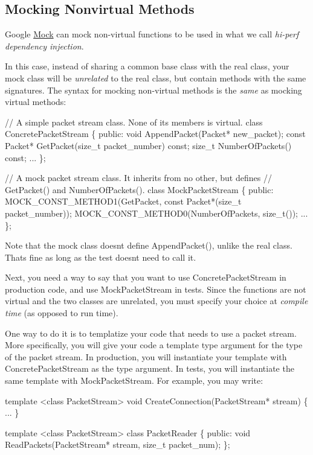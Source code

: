 \subsection*{Mocking Nonvirtual Methods}

Google \hyperlink{class_mock}{Mock} can mock non-\/virtual functions to be used in what we call {\itshape hi-\/perf dependency injection}.

In this case, instead of sharing a common base class with the real class, your mock class will be {\itshape unrelated} to the real class, but contain methods with the same signatures. The syntax for mocking non-\/virtual methods is the {\itshape same} as mocking virtual methods\+:


\begin{DoxyCode}
// A simple packet stream class.  None of its members is virtual.
class ConcretePacketStream \{
 public:
  void AppendPacket(Packet* new\_packet);
  const Packet* GetPacket(size\_t packet\_number) const;
  size\_t NumberOfPackets() const;
  ...
\};

// A mock packet stream class.  It inherits from no other, but defines
// GetPacket() and NumberOfPackets().
class MockPacketStream \{
 public:
  MOCK\_CONST\_METHOD1(GetPacket, const Packet*(size\_t packet\_number));
  MOCK\_CONST\_METHOD0(NumberOfPackets, size\_t());
  ...
\};
\end{DoxyCode}


Note that the mock class doesn\textquotesingle{}t define {\ttfamily Append\+Packet()}, unlike the real class. That\textquotesingle{}s fine as long as the test doesn\textquotesingle{}t need to call it.

Next, you need a way to say that you want to use {\ttfamily Concrete\+Packet\+Stream} in production code, and use {\ttfamily Mock\+Packet\+Stream} in tests. Since the functions are not virtual and the two classes are unrelated, you must specify your choice at {\itshape compile time} (as opposed to run time).

One way to do it is to templatize your code that needs to use a packet stream. More specifically, you will give your code a template type argument for the type of the packet stream. In production, you will instantiate your template with {\ttfamily Concrete\+Packet\+Stream} as the type argument. In tests, you will instantiate the same template with {\ttfamily Mock\+Packet\+Stream}. For example, you may write\+:


\begin{DoxyCode}
template <class PacketStream>
void CreateConnection(PacketStream* stream) \{ ... \}

template <class PacketStream>
class PacketReader \{
 public:
  void ReadPackets(PacketStream* stream, size\_t packet\_num);
\};
\end{DoxyCode}



